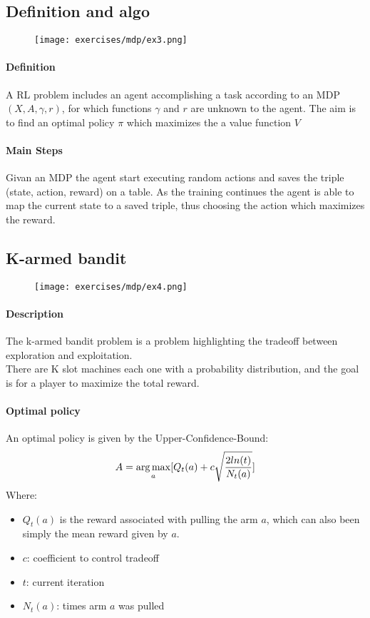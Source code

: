 \subsection{Definition and algo}

\begin{figure}[H]
    \centering
    \texttt{[image: exercises/mdp/ex3.png]}
\end{figure}

\paragraph{Definition}
A RL problem includes an agent accomplishing a task according to an  MDP $(X, A, \gamma, r )$, for which functions $\gamma$ and $r$ are unknown to the agent. The aim is to find an optimal policy $\pi$ which maximizes the a value function $V$ 

\paragraph{Main Steps}
Givan an MDP the agent start executing random actions and saves the triple (state, action, reward) on a table. As the training continues the agent is able to map the current state to a saved triple, thus choosing the action which maximizes the reward.\\

\subsection{K-armed bandit}

\begin{figure}[H]
    \centering
    \texttt{[image: exercises/mdp/ex4.png]}
\end{figure}

\paragraph{Description}
The k-armed bandit problem is a problem highlighting the tradeoff between exploration and exploitation.\\
There are K slot machines each one with a probability distribution, and the goal is for a player to maximize the total reward.

\paragraph{Optimal policy}
An optimal policy is given by the Upper-Confidence-Bound:
$$A=\operatorname*{arg\,max}_a[Q_t(a)+c\sqrt{\frac{2ln(t)}{N_t(a)}}]$$
Where:
\begin{itemize}
\item $Q_t(a)$ is the reward associated with pulling the arm $a$, which can also been simply the mean reward given by $a$.
\item $c$: coefficient to control tradeoff
\item $t$: current iteration
\item $N_t(a)$: times arm $a$ was pulled
\end{itemize}




